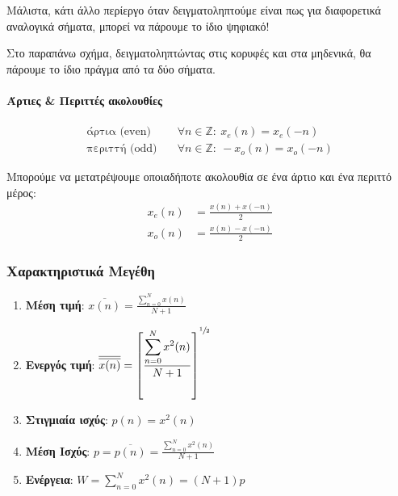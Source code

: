\documentclass[11pt,a4paper,notitlepage,fleqn]{article}
\begin{document}
Μάλιστα, κάτι άλλο περίεργο όταν δειγματοληπτούμε είναι πως για διαφορετικά αναλογικά σήματα, μπορεί
να πάρουμε το ίδιο ψηφιακό!


Στο παραπάνω σχήμα, δειγματοληπτώντας στις κορυφές και στα μηδενικά, θα πάρουμε το ίδιο πράγμα από
τα δύο σήματα.

\paragraph{Άρτιες \& Περιττές ακολουθίες}
\begin{align*}
	\text{άρτια (even)} &\quad \forall n \in \mathbb Z: \ x_e(n) = x_e(-n) \\
	\text{περιττή (odd)} &\quad \forall n \in \mathbb Z: \ -x_o(n) = x_o(-n)
\end{align*}

Μπορούμε να μετατρέψουμε οποιαδήποτε ακολουθία σε ένα άρτιο και ένα περιττό μέρος:
\begin{align*}
	x_e(n) &= \frac{x(n) + x(-n)}{2}\\
	x_o(n) &= \frac{x(n) - x(-n)}{2}
\end{align*}

\subsubsection{Χαρακτηριστικά Μεγέθη}
\begin{enumerate}
	\item \textbf{Μέση τιμή}:
	\( \displaystyle
	\overline{x(n)} = \frac{\displaystyle \sum_{n=0}^{N} x(n)}{N+1}
	 \)
	\item \textbf{Ενεργός τιμή}:
	\( 
	\displaystyle
	\overline{\overline{x(n)}} = \left[
	\frac{\displaystyle \sum_{n=0}^{N} x^2(n)}{N+1}
	\right]^{\sfrac{1}{2} }
	 \)
	\item \textbf{Στιγμιαία ισχύς}:
	\( 
	\displaystyle
	p(n) = x^2(n)
	 \)
	\item \textbf{Μέση Ισχύς}:
	\( 
	\displaystyle
	p = \overline{p(n)} = \frac{\displaystyle \sum_{n=0}^{N} x^2(n)}{N+1}
	 \)
	\item \textbf{Ενέργεια}:
	\( 
	\displaystyle
	W = \sum_{n=0}^{N} x^2(n) = (N+1)p
	 \)
\end{enumerate}
\end{document}
